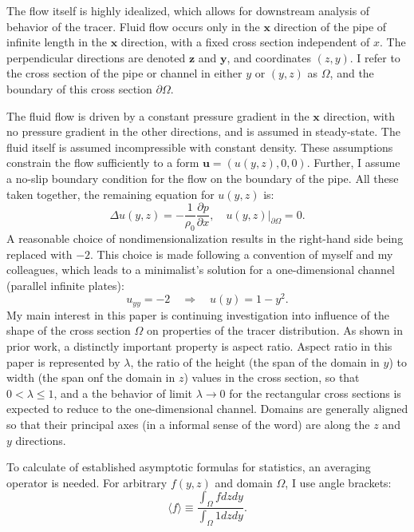 \documentclass{amsart}
\begin{document}
The flow itself is highly idealized, which allows for downstream analysis 
of behavior of the tracer. 
Fluid flow occurs only in the $\mathbf{x}$ direction of the pipe of 
infinite length in the $\mathbf{x}$ direction, with a fixed cross section 
independent of $x$. The 
perpendicular directions are denoted $\mathbf{z}$ and $\mathbf{y}$, and 
coordinates $(z,y)$. 
I refer to the cross section of the pipe or channel in either 
$y$ or $(y,z)$ as $\Omega$, 
and the boundary of this cross section $\partial \Omega$. 

The fluid flow is driven by a 
constant pressure gradient in the $\mathbf{x}$ direction, with no 
pressure gradient in the other directions, and is assumed in 
steady-state. The fluid itself 
is assumed incompressible with constant density. 
These assumptions constrain the flow sufficiently to a form $\mathbf{u} = (u(y,z), 0, 0)$. 
Further, I assume a no-slip boundary condition for the flow on the boundary of the pipe. 
All these taken together, the remaining equation for $u(y,z)$ is:
%
\begin{equation}
\Delta u(y,z) = -\frac{1}{\rho_0} \frac{\partial p}{\partial x}, \quad u(y,z)|_{\partial \Omega} = 0.
\end{equation}
%
A reasonable choice of nondimensionalization results in 
the right-hand side being replaced with $-2$. This choice is made following a convention 
of myself and my colleagues, which leads to a minimalist's 
solution for a one-dimensional channel (parallel infinite plates):
%
\begin{equation}
u_{yy} = -2 \quad \Rightarrow \quad u(y) = 1-y^2.
\end{equation}
%
My main interest in this paper is continuing investigation into influence of 
the shape of the cross section $\Omega$ on properties of the tracer distribution. 
As shown in prior work, a distinctly important property is aspect ratio. 
Aspect ratio in this paper is represented by $\lambda$, the ratio of the height (the span 
of the domain in $y$) to 
width (the span onf the domain in $z$) values in the cross section, 
so that $0 < \lambda \leq 1$, and a 
the behavior of limit $\lambda \to 0$ for 
the rectangular cross sections is expected to reduce to the one-dimensional 
channel.
Domains are generally 
aligned so that their principal axes (in a informal sense of the word) are 
along the $z$ and $y$ directions. 
%

To calculate of established asymptotic formulas for statistics, an averaging 
operator is needed. For arbitrary $f(y,z)$ and domain $\Omega$, I use angle brackets:
\begin{equation}
\langle f \rangle \equiv \frac{\int_{\Omega} f dzdy}{\int_{\Omega} 1 dzdy}.
\end{equation}
\end{document}
